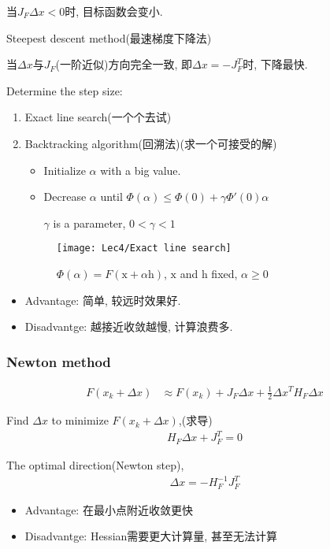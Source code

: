     当$J_F\Delta x<0$时, 目标函数会变小.
    
    Steepest descent method(最速梯度下降法)
    
    当$\Delta x$与$J_F$(一阶近似)方向完全一致, 即$\Delta x=-J_F^T$时, 下降最快.  

    Determine the step size:
    \begin{enumerate}
        \item Exact line search(一个个去试)
        \item Backtracking algorithm(回溯法)(求一个可接受的解)
        \begin{itemize}
            \item Initialize $\alpha$ with a big value.
            \item Decrease $\alpha$ until $\Phi(\alpha)\le\Phi(0)+\gamma\Phi'(0)\alpha$
            
            $\gamma$ is a parameter, $0<\gamma<1$
        \end{itemize}
        \begin{figure}[H]
            \centering
            \texttt{[image: Lec4/Exact line search]}
            \caption{$\Phi(\alpha)=F(\mathrm{x}+\alpha \mathrm{h})$, $\mathrm{x}$ and $\mathrm{h}$ fixed, $\alpha\ge0$}
        \end{figure}
    \end{enumerate}
    \begin{itemize}
        \item Advantage: 简单, 较远时效果好.
        \item Disadvantge: 越接近收敛越慢, 计算浪费多.
    \end{itemize}

    \subsubsection{Newton method }
    \begin{align*}
        F(x_k+\Delta x) &\approx F(x_k)+J_F\Delta x+\frac{1}{2}\Delta x^T H_F \Delta x
    \end{align*}

    Find $\Delta x$ to minimize $F(x_k+\Delta x)$,(求导)
    \begin{align*}
        H_F\Delta x+J_F^T=0
    \end{align*}

    The optimal direction(Newton step),
    \begin{align*}
        \Delta x=-H_F^{-1}J_F^T
    \end{align*}
    \begin{itemize}
        \item Advantage: 在最小点附近收敛更快
        \item Disadvantge: Hessian需要更大计算量, 甚至无法计算
    \end{itemize}

